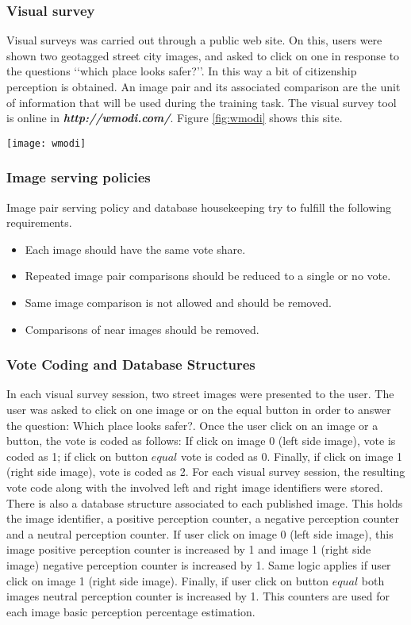 \documentclass{llncs}
\begin{document}
\subsubsection{Visual survey}
Visual surveys was carried out through a public web site. On this, users were shown two geo\-tagged street city images, and asked to click on one in response to the questions ‘‘which place looks safer?’’. In this way a bit of citizenship perception is obtained. An image pair and its associated comparison are the unit of information that will be used during the training task. The visual survey tool is online in \textbf{\textit{http://wmodi.com/}}. Figure \ref{fig:wmodi} shows this site.
\begin{center}
	\centering
	\texttt{[image: wmodi]}
	\label{fig:wmodi}
\end{center}

\subsubsection{Image serving policies}
Image pair serving policy and database housekeeping try to fulfill the following requirements. 
\begin{itemize}
	\item	Each image should have the same vote share.
	\item	Repeated image pair comparisons should be reduced to a single or no vote.
	\item	Same image comparison is not allowed and should be removed.
	\item	Comparisons of near images should be removed.
\end{itemize}

\subsubsection{Vote Coding and Database Structures} 
In each visual survey session, two street images were presented to the user. The user was asked to click on one image or on the equal button in order to answer the question: Which place looks safer?. Once the user click on an image or a button, the vote is coded as follows: If click on image 0 (left side image), vote is coded as 1; if click on button $equal$ vote is coded as 0. Finally, if click on image 1 (right side image), vote is coded as 2. For each visual survey session, the resulting vote code along with the involved left and right image identifiers were stored. There is also a database structure associated to each published image. This holds the image identifier, a positive perception counter, a negative perception counter and a neutral perception counter. If user click on image 0 (left side image), this image positive perception counter is increased by 1 and image 1 (right side image) negative perception counter is increased by 1. Same logic applies if user click on image 1 (right side image). Finally, if user click on button $equal$ both images neutral perception counter is increased by 1. This counters are used for each image basic perception percentage estimation.
\end{document}
